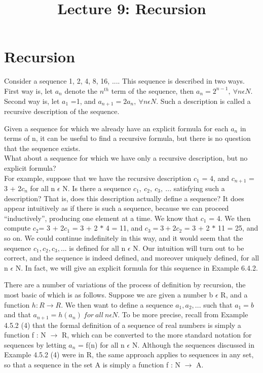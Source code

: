 \documentclass[a4paper,10pt]{report}
\title{Lecture 9: Recursion}
\author{}
\begin{document}
\maketitle
\section{Recursion}
Consider a sequence 1, 2, 4, 8, 16, .... This sequence is described in two ways. First way is, let $a_n$ denote the $n^{th}$ term of the sequence, then $a_n=2^{n-1},~ \forall n\epsilon{N}$. Second way is, let $a_1$ =1, and $a_{n+1}=2a_n,~ \forall n\epsilon{N}$. Such a description is called a recursive description of the sequence.

Given a sequence for which we already have an explicit formula for each $a_n$ in terms of n, it can be useful to find a recursive formula, but there is no question that the sequence exists.\\ What about a sequence for which we have only a recursive description, but no explicit formula?\\ For example, suppose that we have the recursive description $c_1$ = 4, and $c_{n+1}$ = 3 + 2$c_n$ for all n $\epsilon$ N. Is there a sequence $c_1,~ c_2,~ c_3,~ . . .$ satisfying such a description? That is, does this description actually define a sequence? It does appear intuitively as if there is such a sequence, because we can proceed “inductively”, producing one element at a time. We know that $c_1$ = 4. We then compute $c_2$= 3 + 2$c_1$ = 3 + 2 $*$ 4 = 11, and $c_3 = 3 + 2c_2$ = 3 + 2 $*$ 11 = 25, and so on. We could continue indefinitely in this way, and it would seem that the sequence $c_1, c_2, c_3, . . .$ is defined for all n $\epsilon$ N. Our intuition will turn out to be correct, and the sequence is indeed defined, and moreover uniquely defined, for all n $\epsilon$ N. In fact, we will give an explicit formula for this sequence in Example 6.4.2.

There are a number of variations of the process of definition by recursion, the most basic of which is as follows. Suppose we are given a number b $\epsilon$ R, and a function $h:R\rightarrow R$. We then want to define a sequence $a_1,a_2, ...$ such that $a_1=b$ and that $a_{n+1}=h(a_n)~for ~all~  n \epsilon N$. To be more precise, recall from Example 4.5.2 (4) that the formal definition of a sequence of real numbers is simply a function f : N $\rightarrow$ R, which can be converted to the more standard notation for sequences by letting $a_n$ = f(n) for all n $\epsilon$ N. Although the sequences discussed in Example 4.5.2 (4) were in R, the same approach applies to sequences in any set, so that a sequence in the set A is simply a function f : N $\rightarrow$ A.
\end{document}

